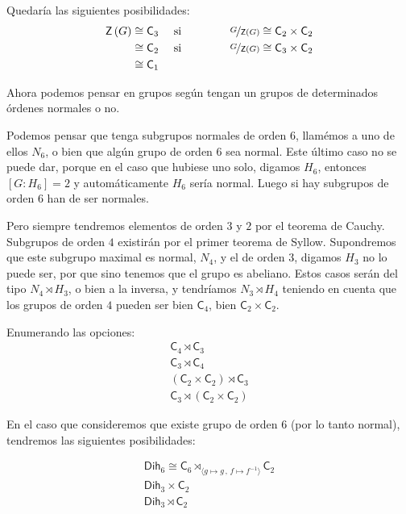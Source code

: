 \documentclass[12pt,a4paper,fleqn,spanish,final,openright]{extbook}
\theoremstyle{definition}
\theoremstyle{remark}
\begin{document}
 Quedaría las siguientes posibilidades:
\begin{align}
\mathsf{Z}\left(G\right) &   \cong    \mathsf{C}_{3} &\text{ si }\quad\quad\quad\quad&
\nicefrac{G}{\mathsf{Z}\left(G\right)}   \cong    \mathsf{C}_{2}   \times    \mathsf{C}_{2}\\
&   \cong    \mathsf{C}_{2}  &\text{ si }\quad\quad\quad\quad& \nicefrac{G}{\mathsf{Z}\left(G\right)}
   \cong    \mathsf{C}_{3}   \times    \mathsf{C}_{2}\\
&   \cong    \mathsf{C}_{1}&&
\end{align}

Ahora podemos pensar en grupos según tengan un grupos de determinados órdenes normales o no.

Podemos pensar que tenga subgrupos normales de orden $6$, llamémos a uno de ellos $N_6$, o bien que algún grupo de
orden $6$ sea normal. Este último caso no se puede dar, porque en el caso que hubiese uno solo, digamos $H_6$, entonces $[G:H_6]=2$ y automáticamente $H_6$ sería normal. Luego si hay subgrupos de orden $6$ han de ser normales.

Pero siempre tendremos elementos de orden $3$ y $2$ por el teorema de Cauchy. Subgrupos de orden $4$ existirán por el primer teorema de Syllow. Supondremos que este subgrupo maximal es normal, $N_4$, y el de orden $3$, digamos $H_3$ no lo puede ser, por que sino tenemos que el grupo es abeliano. Estos casos serán del tipo $N_4\rtimes H_3$, o bien a la inversa, y tendríamos $N_3\rtimes H_4$ teniendo en cuenta que los grupos de orden $4$ pueden ser bien $\mathsf{C}_{4}$, bien $\mathsf{C}_{2}    \times    \mathsf{C}_{2}$.

Enumerando las opciones:
\begin{align}
\mathsf{C}_{4}\rtimes \mathsf{C}_{3}\\
\mathsf{C}_{3}\rtimes \mathsf{C}_{4}\\
\left(\mathsf{C}_{2}   \times   \mathsf{C}_{2}\right)\rtimes \mathsf{C}_{3}\\
\mathsf{C}_{3}\rtimes \left(\mathsf{C}_{2}   \times   \mathsf{C}_{2}\right)
\end{align}

En el caso que consideremos que existe grupo de orden $6$ (por lo tanto normal), tendremos las siguientes posibilidades:

\begin{align}
\mathsf{Dih}_{6}   \cong   \mathsf{C}_{6}\rtimes_{\langle{g   \mapsto g\,,\,f   \mapsto f^{-1}}\rangle} \mathsf{C}_{2}\\
\mathsf{Dih}_{3}    \times    \mathsf{C}_{2}\\
\mathsf{Dih}_{3} \rtimes \mathsf{C}_{2}
\end{align}
\end{document}
